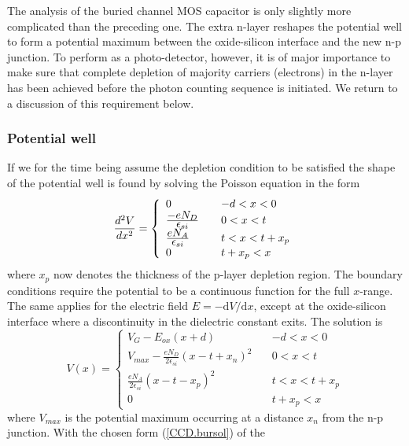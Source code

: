 \documentclass{article}
\newcommand{\dd}[2]{{{d^2#1}\over{d#2^2}}}
\def\rd{\mbox{d}}
\begin{document}
The analysis of the buried channel MOS capacitor is only slightly more
complicated than the preceding one. The extra n-layer reshapes the
potential well to form a potential maximum between the oxide-silicon
interface and the new n-p junction. To perform as a photo-detector,
however, it is of major importance to make sure that complete
depletion of majority carriers (electrons) in the n-layer has been
achieved before the photon counting sequence is initiated. We return
to a discussion of this requirement below.

\subsubsection*{Potential well}

If we for the time being assume the depletion condition to be
satisfied the shape of the potential well is found by solving the
Poisson equation in the form
\begin{equation}
  \dd{V}{x} = \left\{ \begin{array}{ll} 
	0 & -d < x < 0 \\
	\frac{\displaystyle -eN_D}{\displaystyle \epsilon_{si}} \quad &
	0 < x < t \\
	\frac{\displaystyle eN_A}{\displaystyle\epsilon_{si}} & 
	t < x < t+x_p \\
	0 & t+x_p < x
  \end{array} \right.
  \label{CCD.Poissonbur}
\end{equation}
where $x_p$ now denotes the thickness of the p-layer depletion
region. The boundary conditions require the potential to be a
continuous function for the full $x$-range. The same applies for the
electric field $E = -\rd V/\rd x$, except at the oxide-silicon
interface where a discontinuity in the dielectric constant exits.
The solution is
\begin{equation}
  V(x) = \left\{ \begin{array}{ll} 
	V_G-E_{ox}(x+d) & -d < x < 0 \\
	V_{max} - \frac{\displaystyle
	eN_D}{\displaystyle 2\epsilon_{si}} (x-t+x_n)^2 \quad & 
	0 < x < t \\ 
	\frac{\displaystyle eN_A}{\displaystyle
	2\epsilon_{si}}(x-t-x_p)^2 & t < x < t+x_p \\
	0 & t+x_p < x 
	\end{array} \right.
  \label{CCD.bursol}
\end{equation}
where $V_{max}$ is the potential maximum occurring at a distance $x_n$
from the n-p junction. With the chosen form (\ref{CCD.bursol}) of the
\end{document}
